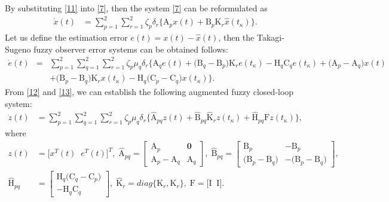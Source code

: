 \documentclass[preprint,11pt]{elsarticle}
\begin{document}
\vspace{-0.4cm}
By substituting \eqref{11} into \eqref{7}, then the system \eqref{7} can be reformulated as
\begin{align}\label{12}
\dot{x}(t)&=\sum^{2}_{p=1}\sum^{2}_{r=1}\zeta_p\delta_r\big\{\mathrm{A}_{p}x(t)
+\mathrm{B}_{p}\mathrm{K}_r \hat{x}(t_\kappa)\big\}.
\end{align}
Let us define the estimation error $e(t)=x(t)-\hat{x}(t)$, then the {Takagi-Sugeno} fuzzy observer error systems can be obtained follows:
\begin{eqnarray}\label{13}
\dot{e}(t)&=&\sum^{2}_{p=1}\sum^{2}_{q=1}\sum^{2}_{r=1}\zeta_p\mu_q\delta_r\Big\{\mathrm{A}_{q}e(t)
+\big(\mathrm{B}_{q}-\mathrm{B}_{p}\big)\mathrm{K}_r e(t_\kappa)
-\mathrm{H}_q \mathrm{C}_q e(t_\kappa) + \big(\mathrm{A}_{p}-\mathrm{A}_{q}\big)x(t)\nonumber\\
\quad&&+\big(\mathrm{B}_{p}-\mathrm{B}_{q}\big)\mathrm{K}_r x(t_\kappa)
-\mathrm{H}_q \big(\mathrm{C}_{p}-\mathrm{C}_{q}\big) x(t_\kappa) \Big\}.
\end{eqnarray}
From \eqref{12} and \eqref{13}, we can establish the following augmented fuzzy closed-loop system:
\begin{align}\label{14}
\dot{z}(t)&=\sum^{2}_{p=1}\sum^{2}_{q=1}\sum^{2}_{r=1}\zeta_p\mu_q\delta_r\Big\{\mathrm{\widehat{A}}_{pq}z(t)
+\mathrm{\widehat{B}}_{pq}\mathrm{\widehat{K}}_r z(t_\kappa)
+\mathrm{\widehat{H}}_{pq}\mathrm{F}z(t_\kappa)\Big\},
\end{align}
where
\begin{align*}
z(t)&=\big[ x^T(t)\;\;e^T(t) \big]^T,\;
\mathrm{\widehat{A}}_{pq}=
\begin{bmatrix}
\mathrm{A}_{p}& \mathbf{0}\\
\mathrm{A}_{p}-\mathrm{A}_{q}& \mathrm{A}_{q}
\end{bmatrix},\;
\mathrm{\widehat{B}}_{pq}=
\begin{bmatrix}
\mathrm{B}_{p}& -\mathrm{B}_{p}\\
\big(\mathrm{B}_{p}-\mathrm{B}_{q}\big)& -\big(\mathrm{B}_{p}-\mathrm{B}_{q}\big)
\end{bmatrix},\\
\mathrm{\widehat{H}}_{pq}&=
\begin{bmatrix}
\mathrm{H}_q \big(\mathrm{C}_{q}-\mathrm{C}_{p}\big)\\
-\mathrm{H}_q \mathrm{C}_{q}
\end{bmatrix},\;
\mathrm{\widehat{K}}_r=diag\{\mathrm{{K}}_r,\mathrm{{K}}_r\},\;\mathrm{F}=\big[ \mathrm{I}\;\;\mathrm{I} \big].
\end{align*}
\end{document}
